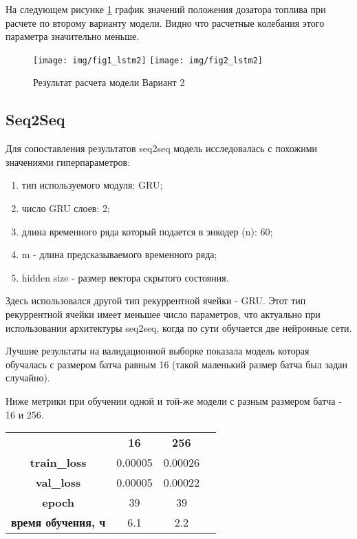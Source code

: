 \documentclass[12pt,a4paper]{article}
\begin{document}
На следующем рисунке \ref{fig:res_lstm2} график значений положения дозатора топлива при расчете по второму варианту модели. Видно что расчетные колебания этого параметра значительно меньше.

\begin{figure}[htb]
	\centering\texttt{[image: img/fig1\_lstm2]}
	\centering\texttt{[image: img/fig2\_lstm2]}
	\caption{Результат расчета модели Вариант 2}
	\label{fig:res_lstm2}
\end{figure}


\subsection{Seq2Seq}

\begin{description}
	\item Для сопоставления результатов seq2seq модель исследовалась с похожими значениями гиперпараметров:
	\begin{enumerate}
		\item тип используемого модуля: GRU;
		\item число GRU слоев: 2;
		\item длина временного ряда который подается в энкодер (n): 60;
		\item m - длина предсказываемого временного ряда;
		\item hidden size - размер вектора скрытого состояния.	
	\end{enumerate}
\end{description}

Здесь использовался другой тип рекуррентной ячейки - GRU. Этот тип рекуррентной ячейки имеет меньшее число параметров, что актуально при использовании архитектуры seq2seq, когда по сути обучается две нейронные сети.

Лучшие результаты на валидационной выборке показала модель которая обучалась с размером батча равным 16 (такой маленький размер батча был задан случайно).

Ниже метрики при обучении одной и той-же модели с разным размером батча - 16 и 256.

\begin{center}
	\begin{tabular}{ |c|c|c|c| } 
		\hline
		& {\bf 16} & {\bf 256} \\ 
		{\bf train\_loss} & 0.00005 & 0.00026 \\ 
		{\bf val\_loss} & 0.00005 & 0.00022 \\
		{\bf epoch} & 39 & 39 \\
		{\bf время обучения, ч} & 6.1 & 2.2 \\
		\hline
	\end{tabular}
\end{center}
\end{document}
